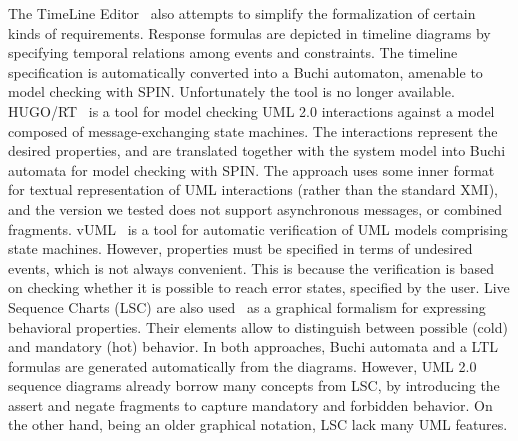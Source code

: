 \documentclass[letter]{llncs}
\begin{document}
The TimeLine Editor~\cite{Smith:2001:ECG:882477.883639} also attempts to simplify the formalization of certain
kinds of requirements. Response formulas are depicted in timeline diagrams by specifying temporal relations among events and constraints. 
The timeline specification is automatically converted into a Buchi automaton, amenable to model checking with SPIN.
Unfortunately the tool is no longer available.
HUGO/RT~\cite{Knapp:2006:MCU:1762828.1762836} is a tool for model checking UML 2.0 interactions 
against a model composed of message-exchanging state machines. The interactions represent the desired properties,
and are translated together with the system model into Buchi automata for model checking with SPIN.
The approach uses some inner format for textual representation of UML interactions (rather than
the standard XMI), and the version we tested does not support asynchronous messages, or combined fragments.
vUML~\cite{Lilius99vuml:a} is a tool for automatic verification of UML models comprising state machines.
However, properties must be specified in terms of undesired events, which is not always convenient.
This is because the verification is based on checking whether it is possible to reach error states, specified by the user.
Live Sequence Charts (LSC) are also used~\cite{Kugler:2005:TLS:2140653.2140692,MVPSA} as a graphical formalism for expressing behavioral properties.
Their elements allow to distinguish between possible (cold) and mandatory (hot) behavior.
In both approaches, Buchi automata and a LTL formulas are generated automatically from the diagrams.
However, UML 2.0 sequence diagrams already borrow many concepts from LSC, by introducing the assert and negate fragments
to capture mandatory and forbidden behavior. On the other hand, being an older graphical notation, LSC lack many UML features.


% 
% 
\end{document}
